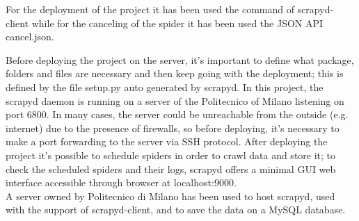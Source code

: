 For the deployment of the project it has been used  the command of scrapyd-client while for the canceling of the spider it has been used the JSON API cancel.json.
\par
Before deploying the project on the server, it's important to define what package, folders and files are necessary and then keep going with the deployment; this is defined by the file setup.py auto generated by scrapyd. 
In this project, the scrapyd daemon is running on a server of the Politecnico of Milano listening on port 6800. 
In many cases, the server could be unreachable from the outside (e.g. internet) due to the presence of firewalls, so before deploying, it's necessary to make a port forwarding to the server via SSH protocol. 
After deploying the project it's possible to schedule spiders in order to crawl data and store it; to check the scheduled spiders and their logs, scrapyd offers a minimal GUI web interface accessible through browser at localhost:9000. \\
A server owned by Politecnico di Milano has been used to host scrapyd, used with the support of scrapyd-client, and to save the data on a MySQL database.